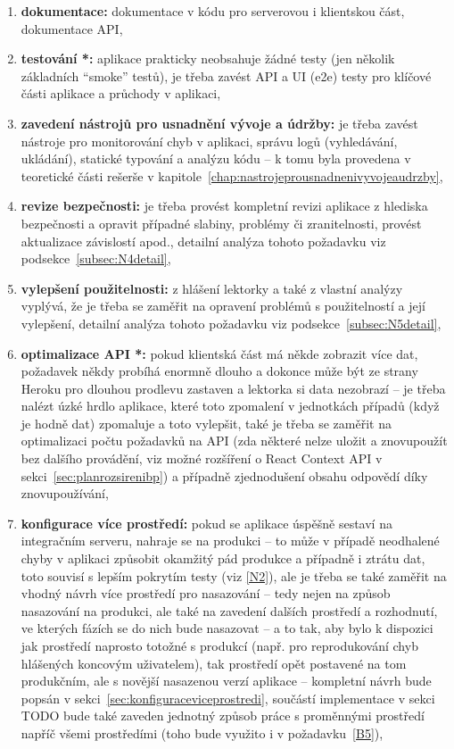 \begin{enumerate}[label=\textbf{N\arabic*}]
    \item \label{N1} \textbf{dokumentace:} dokumentace v kódu pro serverovou i klientskou část, dokumentace API,
    \item \label{N2} \textbf{testování *:} aplikace prakticky neobsahuje žádné testy (jen několik základních \enquote{smoke} testů), je třeba zavést API a UI (e2e) testy pro klíčové části aplikace a průchody v aplikaci,
    \item \label{N3} \textbf{zavedení nástrojů pro usnadnění vývoje a údržby:} je třeba zavést nástroje pro monitorování chyb v aplikaci, správu logů (vyhledávání, ukládání), statické typování a analýzu kódu -- k tomu byla provedena v teoretické části rešerše v kapitole~\ref{chap:nastrojeprousnadnenivyvojeaudrzby},
    \item \label{N4} \textbf{revize bezpečnosti:} je třeba provést kompletní revizi aplikace z hlediska bezpečnosti a opravit případné slabiny, problémy či zranitelnosti, provést aktualizace závislostí apod., detailní analýza tohoto požadavku viz podsekce~\ref{subsec:N4detail},
    \item \label{N5} \textbf{vylepšení použitelnosti:} z hlášení lektorky a také z vlastní analýzy vyplývá, že je třeba se zaměřit na opravení problémů s použitelností a její vylepšení, detailní analýza tohoto požadavku viz podsekce~\ref{subsec:N5detail},
    \item \label{N6} \textbf{optimalizace API *:} pokud klientská část má někde zobrazit více dat, požadavek někdy probíhá enormně dlouho a dokonce může být ze strany Heroku pro dlouhou prodlevu zastaven a lektorka si data nezobrazí -- je třeba nalézt úzké hrdlo aplikace, které toto zpomalení v jednotkách případů (když je hodně dat) zpomaluje a toto vylepšit, také je třeba se zaměřit na optimalizaci počtu požadavků na API (zda některé nelze uložit a znovupoužít bez dalšího provádění, viz možné rozšíření o React Context API v sekci~\ref{sec:planrozsirenibp}) a případně zjednodušení obsahu odpovědí díky znovupoužívání,
    \item \label{N7} \textbf{konfigurace více prostředí:} pokud se aplikace úspěšně sestaví na integračním serveru, nahraje se na produkci \cite{bp} -- to může v případě neodhalené chyby v aplikaci způsobit okamžitý pád produkce a případně i ztrátu dat, toto souvisí s lepším pokrytím testy (viz \ref{N2}), ale je třeba se také zaměřit na vhodný návrh více prostředí pro nasazování -- tedy nejen na způsob nasazování na produkci, ale také na zavedení dalších prostředí a rozhodnutí, ve kterých fázích se do nich bude nasazovat -- a to tak, aby bylo k dispozici jak prostředí naprosto totožné s produkcí (např. pro reprodukování chyb hlášených koncovým uživatelem), tak prostředí opět postavené na tom produkčním, ale s novější nasazenou verzí aplikace -- kompletní návrh bude popsán v sekci~\ref{sec:konfiguraceviceprostredi}, součástí implementace v sekci TODO bude také zaveden jednotný způsob práce s proměnnými prostředí napříč všemi prostředími (toho bude využito i v požadavku~\ref{B5}),

\end{enumerate}
